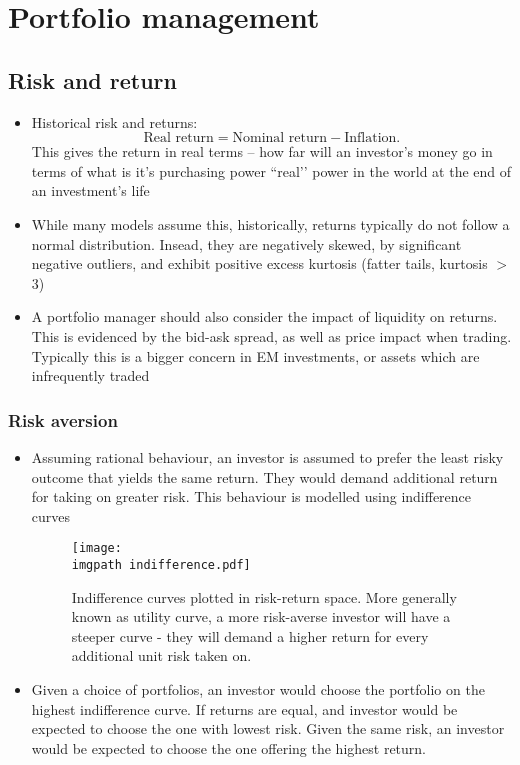 \documentclass[../notes_compiled.tex]{subfiles}
\begin{document}
\section{Portfolio management}
\subsection{Risk and return}
\begin{itemize}
\item Historical risk and returns:
\begin{equation}
\text{Real return} = \text{Nominal return} - \text{Inflation}.
\end{equation}
This gives the return in real terms -- how far will an investor’s money go in terms of what is it’s purchasing power ``real’’ power in the world at the end of an investment’s life
\item While many models assume this, historically, returns typically do not follow a normal distribution. Insead, they are negatively skewed, by significant negative outliers, and exhibit positive excess kurtosis (fatter tails, kurtosis $>$ 3)
\item A portfolio manager should also consider the impact of liquidity on returns. This is evidenced by the bid-ask spread, as well as price impact when trading. Typically this is a bigger concern in EM investments, or assets which are infrequently traded
\end{itemize}

\subsubsection{Risk aversion}
\begin{itemize}
\item Assuming rational behaviour, an investor is assumed to prefer the least risky outcome that yields the same return. They would demand additional return for taking on greater risk. This behaviour is modelled using indifference curves
\vspace{-.2cm}
\begin{figure}[h]
  \centering
  \texttt{[image: \\imgpath indifference.pdf]}
  \caption{Indifference curves plotted in risk-return space. More generally known as utility curve, a more risk-averse investor will have a steeper curve - they will demand a higher return for every additional unit risk taken on.}
\end{figure}
\vspace{-.25cm}
\item Given a choice of portfolios, an investor would choose the portfolio on the highest indifference curve. If returns are equal, and investor would be expected to choose the one with lowest risk. Given the same risk, an investor would be expected to choose the one offering the highest return.
\end{itemize}
\end{document}
